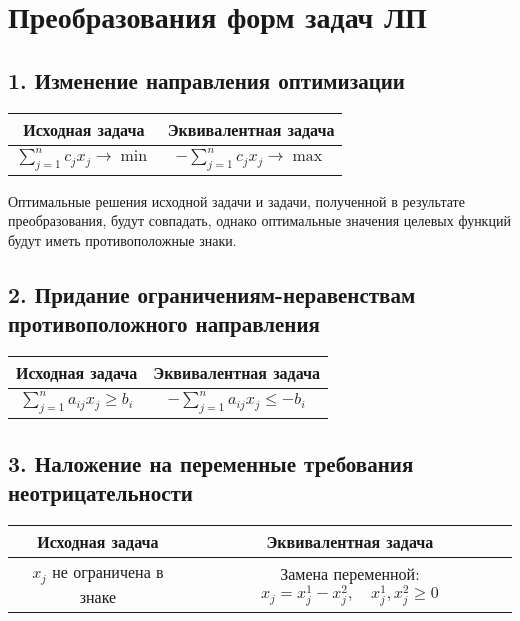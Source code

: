 \documentclass[17pt]{extarticle}
\begin{document}
\section{Преобразования форм задач ЛП}

\subsection{1. Изменение направления оптимизации}

\begin{center}
    \begin{tabular}{|c|c|}
        \hline
        \textbf{Исходная задача}                   & \textbf{Эквивалентная задача}               \\
        \hline
        \( \sum\limits_{j=1}^n c_j x_j \to \min \) & \( -\sum\limits_{j=1}^n c_j x_j \to \max \) \\
        \hline
    \end{tabular}
\end{center}

Оптимальные решения исходной задачи и задачи, полученной в результате преобразования, будут совпадать, однако оптимальные значения целевых функций будут иметь противоположные знаки.

\subsection{2. Придание ограничениям-неравенствам противоположного направления}

\begin{center}
    \begin{tabular}{|c|c|}
        \hline
        \textbf{Исходная задача}                     & \textbf{Эквивалентная задача}                  \\
        \hline
        \( \sum\limits_{j=1}^n a_{ij} x_j \ge b_i \) & \( -\sum\limits_{j=1}^n a_{ij} x_j \le -b_i \) \\
        \hline
    \end{tabular}
\end{center}

\subsection{3. Наложение на переменные требования неотрицательности}

\begin{center}
    \begin{tabular}{|c|c|}
        \hline
        \textbf{Исходная задача}        & \textbf{Эквивалентная задача}                                          \\
        \hline
        \( x_j \) не ограничена в знаке & Замена переменной: \( x_j = x_j^1 - x_j^2, \quad x_j^1, x_j^2 \ge 0 \) \\
        \hline
    \end{tabular}
\end{center}
\end{document}
